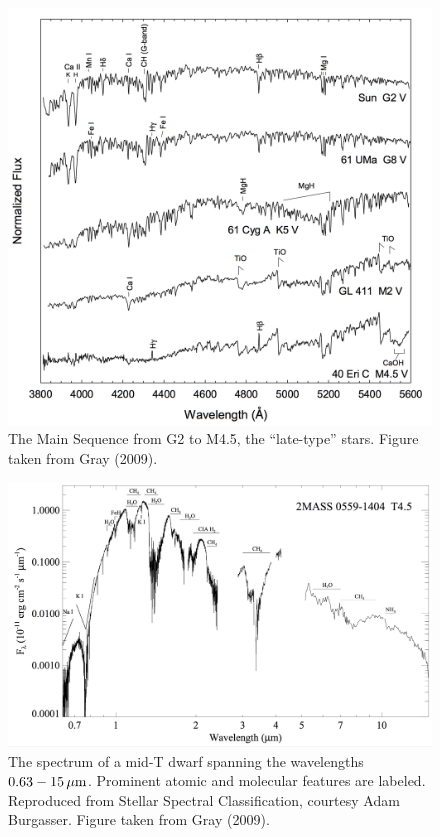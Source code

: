 \documentclass[a4paper,10pt]{article}
\begin{document}
\begin{figure}[h]
    \centering
    \includegraphics[width=14cm]{figures/StellarSpectra_GM.png}
    \caption{\footnotesize{The Main Sequence from G2 to M4.5, the ``late-type'' stars. Figure taken from Gray (2009).}}
    \label{fig:stellarspec_gm}
\end{figure}

\begin{figure}[h!]
    \centering
    \includegraphics[width=12cm]{figures/Tdwarf.png}
    \caption{\footnotesize{The spectrum of a mid-T dwarf spanning the wavelengths $0.63-15\,\mu{\rm m}$. Prominent atomic and molecular features are labeled. Reproduced from Stellar Spectral Classification, courtesy Adam Burgasser. Figure taken from Gray (2009).}}
    \label{fig:tdwarf}
\end{figure}
\end{document}
